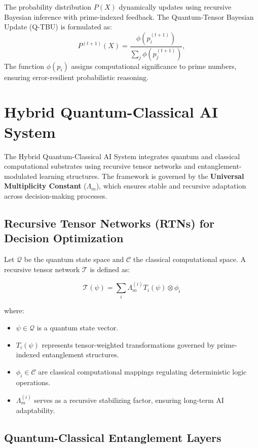\documentclass{article}
\theoremstyle{plain}
\begin{document}
The probability distribution $P(X)$ dynamically updates using recursive Bayesian inference with prime-indexed feedback. The Quantum-Tensor Bayesian Update (Q-TBU) is formulated as:
\begin{equation}
    P^{(t+1)}(X) = \frac{\phi(p_i^{(t+1)})}{\sum_{j} \phi(p_j^{(t+1)})},
\end{equation}
The function $\phi(p_i)$ assigns computational significance to prime numbers, ensuring error-resilient probabilistic reasoning. 


\section{Hybrid Quantum-Classical AI System}

The Hybrid Quantum-Classical AI System integrates quantum and classical computational substrates using recursive tensor networks and entanglement-modulated learning structures. The framework is governed by the \textbf{Universal Multiplicity Constant} ($\Lambda_m$), which ensures stable and recursive adaptation across decision-making processes.

\subsection{Recursive Tensor Networks (RTNs) for Decision Optimization}

Let $\mathcal{Q}$ be the quantum state space and $\mathcal{C}$ the classical computational space. A recursive tensor network $\mathcal{T}$ is defined as:

\begin{equation}
    \mathcal{T}(\psi) = \sum_{i} \Lambda_m^{(i)} T_i(\psi) \otimes \phi_i
\end{equation}

where:
\begin{itemize}
    \item $\psi \in \mathcal{Q}$ is a quantum state vector.
    \item $T_i(\psi)$ represents tensor-weighted transformations governed by prime-indexed entanglement structures.
    \item $\phi_i \in \mathcal{C}$ are classical computational mappings regulating deterministic logic operations.
    \item $\Lambda_m^{(i)}$ serves as a recursive stabilizing factor, ensuring long-term AI adaptability.
\end{itemize}

\subsection{Quantum-Classical Entanglement Layers}
\end{document}
